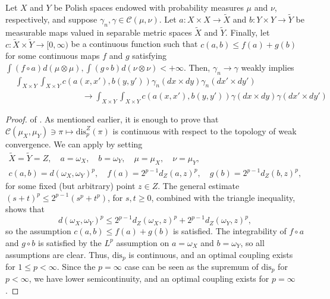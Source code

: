 \documentclass[twoside,11pt]{article}
\theoremstyle{definition}
\newcommand{\disp}{\mathrm{dis}_p}
\begin{document}
\begin{lemma}
    \label{lem: santam1.8general}
    Let $X$ and $Y$ be Polish spaces endowed with probability measures $\mu$ and $\nu$, respectively, and suppose $\gamma_n, \gamma \in \mathcal{C}(\mu,\nu)$. Let $a:X\times X \to \tilde{X}$ and $b:Y\times Y\to \tilde{Y}$ be measurable maps valued in  separable metric spaces $\tilde{X}$ and $\tilde{Y}$. Finally, let $c:\tilde{X}\times \tilde{Y}\to [0,\infty)$ be a continuous function such that $c(a,b)\leq f(a)+g(b)$ for some continuous maps $f$ and $g$ satisfying $\int (f\circ a)d(\mu\otimes \mu), \int (g\circ b)d(\nu\otimes \nu) <+\infty$. Then, $\gamma_n\to \gamma$ weakly implies
    \begin{align}
        &\int_{X\times Y}\int_{X\times Y}c(a(x,x'),b(y,y'))\gamma_n(dx \times dy) \gamma_n (dx' \times dy') \\
        & \qquad \qquad \qquad \qquad \to \int_{X\times Y}\int_{X\times Y}c(a(x,x'),b(y,y'))\gamma(dx \times dy) \gamma(dx' \times dy')
    \end{align}
   \begin{equation}
    \end{equation}
\end{lemma}


\begin{proof}of .
    As mentioned earlier, it is enough to prove that $\mathcal{C}(\mu_X,\mu_Y)\ni \pi \mapsto \disp^Z(\pi)$ is continuous with respect to the topology of weak convergence. We can apply  by setting 
    \begin{equation} 
  \begin{gathered}
    \tilde{X}=\tilde{Y}=Z, \quad  a=\omega_X, \quad b=\omega_Y, \quad \mu=\mu_X, \quad \nu=\mu_Y,       \\
    c(a,b)=d(\omega_X,\omega_Y)^p, \quad  f(a)=2^{p-1}d_Z(a,z)^p, \quad  g(b)=2^{p-1}d_Z(b,z)^p,
  \end{gathered}
\end{equation}
for some fixed (but arbitrary) point $z\in Z$. The general estimate $(s+t)^p\leq 2^{p-1}(s^p+t^p)$, for $s,t\geq 0$, combined with the triangle inequality, shows that 
\[
d(\omega_X,\omega_Y)^p \leq 2^{p-1}d_Z(\omega_X,z)^p+2^{p-1}d_Z(\omega_Y,z)^p,
\]
so the assumption $c(a,b)\leq f(a)+g(b)$ is satisfied. The integrability of $f\circ a$ and $g\circ b$ is satisfied by the $L^p$ assumption on $a=\omega_X$ and $b=\omega_Y$, so all assumptions are clear. Thus, $\disp$ is continuous, and an optimal coupling exists for $1\leq p<\infty$. Since the $p=\infty$ case can be seen as the supremum of $\disp$ for $p<\infty$, we have lower semicontinuity, and an optimal coupling exists for $p=\infty$.
\end{proof}
\end{document}
